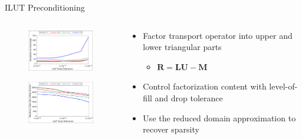 \documentclass{beamer}
\begin{document}
\begin{frame}{ILUT Preconditioning}

  \begin{columns}

    \begin{column}{0.5\textwidth}

      \begin{figure}[t!]
        \begin{center}
          \includegraphics[width=2.0in]{ilut_iterations.pdf}
        \end{center}
      \end{figure}

      \begin{figure}[t!]
        \begin{center}
          \includegraphics[width=2.0in]{ilut_size.pdf}
        \end{center}
      \end{figure}

    \end{column}

    \begin{column}{0.5\textwidth}

      \begin{itemize}
      \item {\small Factor transport operator into upper and lower
        triangular parts}
        \begin{itemize}
        \item {\small $\mathbf{R} = \mathbf{L} \mathbf{U} -
          \mathbf{M}$}
        \end{itemize}
      \item {\small Control factorization content with level-of-fill
        and drop tolerance}
      \item {\small Use the reduced domain approximation to recover
        sparsity}
      \end{itemize}


\end{column}
\end{columns}
\end{frame}
\end{document}
